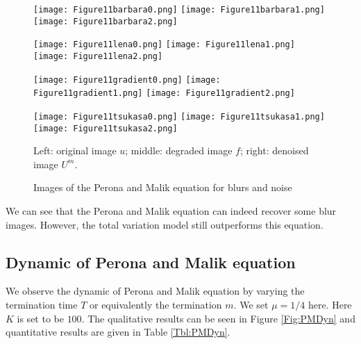 \documentclass[english, nochinese]{pnote}
\begin{document}
\begin{figure}[htb]
{
\centering

\texttt{[image: Figure11barbara0.png]}
\texttt{[image: Figure11barbara1.png]}
\texttt{[image: Figure11barbara2.png]}

\texttt{[image: Figure11lena0.png]}
\texttt{[image: Figure11lena1.png]}
\texttt{[image: Figure11lena2.png]}

\texttt{[image: Figure11gradient0.png]}
\texttt{[image: Figure11gradient1.png]}
\texttt{[image: Figure11gradient2.png]}

\texttt{[image: Figure11tsukasa0.png]}
\texttt{[image: Figure11tsukasa1.png]}
\texttt{[image: Figure11tsukasa2.png]}

\caption{Images of the Perona and Malik equation for blurs and noise}
\label{Fig:PMEnh}
}
{
\footnotesize Left: original image $u$; middle: degraded image $f$; right: denoised image $U^m$.
}
\end{figure}

We can see that the Perona and Malik equation can indeed recover some blur images. However, the total variation model still outperforms this equation.

\subsection{Dynamic of Perona and Malik equation}

We observe the dynamic of Perona and Malik equation by varying the termination time $T$ or equivalently the termination $m$. We set $ \mu = 1 / 4 $ here. Here $K$ is set to be $100$. The qualitative results can be seen in Figure \ref{Fig:PMDyn} and quantitative results are given in Table \ref{Tbl:PMDyn}.
\end{document}
